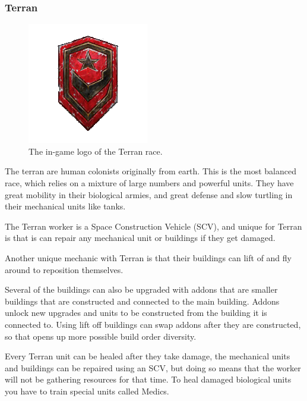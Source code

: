 \subsubsection{Terran}
\begin{figure}[h!tb]
\centering
\includegraphics[scale=0.7]{graphics/terranicon.png}
\caption{The in-game logo of the Terran race.\cite{terranlogo}}
\end{figure}

The terran are human colonists originally from earth. This is the most balanced race, which relies on a mixture of large numbers and powerful units. They have great mobility in their biological armies, and  great defense and slow turtling in their mechanical units like tanks. 

The Terran worker is a Space Construction Vehicle (SCV), and unique for Terran is that is can repair any mechanical unit or buildings if they get damaged.

Another unique mechanic with Terran is that their buildings can lift of and fly around to reposition themselves.

Several of the buildings can also be upgraded with addons that are smaller buildings that are constructed and connected to the main building. Addons unlock new upgrades and units to be constructed from the building it is connected to. Using lift off buildings can swap addons after they are constructed, so that opens up more possible build order diversity.

Every Terran unit can be healed after they take damage, the mechanical units and buildings can be repaired using an SCV, but doing so means that the worker will not be gathering resources for that time. To heal damaged biological units you have to train special units called Medics. 

